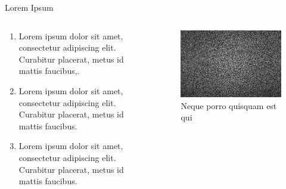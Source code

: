 \documentclass[UKenglish, aspectratio = 169]{beamer}
\begin{document}
\begin{frame}{Lorem Ipsum}
	\begin{columns}
		\begin{column}{0.4\textwidth}
			\begin{enumerate}[<+->]
				\item<1-> Lorem ipsum dolor sit amet, consectetur adipiscing elit. Curabitur placerat, metus id mattis faucibus,.
				\item<2-> Lorem ipsum dolor sit amet, consectetur adipiscing elit. Curabitur placerat, metus id mattis faucibus.
				\item<3-> Lorem ipsum dolor sit amet, consectetur adipiscing elit. Curabitur placerat, metus id mattis faucibus.
			\end{enumerate}
		\end{column}
			\begin{column}{0.6\textwidth}
				\onslide<1->
		\begin{figure}
			\centering
			\parbox{\linewidth}{\includegraphics{figs/stock photo.jpg}}
			\caption{\tiny{Neque porro quisquam est qui }}
		\end{figure}
	\end{column}
	\end{columns}
\end{frame}
\end{document}
